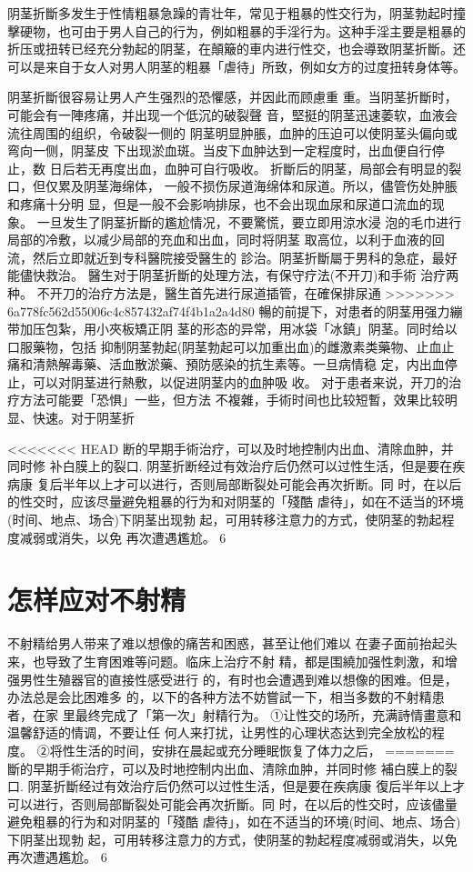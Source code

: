 \documentclass[12pt,UTF8]{ctexbook}
\begin{document}
阴茎折斷多发生于性情粗暴急躁的青壮年，常见于粗暴的性交行为，阴茎勃起时撞擊硬物，也可由于男人自己的行为，例如粗暴的手淫行为。这种手淫主要是粗暴的折压或扭转已经充分勃起的阴茎，在顛簸的車内进行性交，也会導致阴茎折斷。还可以是来自于女人对男人阴茎的粗暴「虐待」所致，例如女方的过度扭转身体等。

阴茎折斷很容易让男人产生强烈的恐懼感，并因此而顾慮重
重。当阴茎折斷时，可能会有一陣疼痛，并出现一个低沉的破裂聲
音，堅挺的阴茎迅速萎软，血液会流往周围的组织，令破裂一侧的
阴茎明显肿脹，血肿的压迫可以使阴茎头偏向或弯向一侧，阴茎皮
下出现淤血斑。当皮下血肿达到一定程度时，出血便自行停止，数
日后若无再度出血，血肿可自行吸收。
折斷后的阴茎，局部会有明显的裂口，但仅累及阴茎海绵体，
一般不损伤尿道海绵体和尿道。所以，儘管伤处肿脹和疼痛十分明
显，但是一般不会影响排尿，也不会出现血尿和尿道口流血的现
象。
一旦发生了阴茎折斷的尷尬情况，不要驚慌，要立即用涼水浸
泡的毛巾进行局部的冷敷，以减少局部的充血和出血，同时将阴茎
取高位，以利于血液的回流，然后立即就近到专科醫院接受醫生的
診治。阴茎折斷屬于男科的急症，最好能儘快救治。
醫生对于阴茎折斷的处理方法，有保守疗法(不开刀)和手術
治疗两种。
不开刀的治疗方法是，醫生首先进行尿道插管，在確保排尿通
>>>>>>> 6a778fc562d55006c4c857432af74f4b1a2a4d80
暢的前提下，对患者的阴茎用强力繃带加压包紮，用小夾板矯正阴
茎的形态的异常，用冰袋「冰鎮」阴茎。同时给以口服藥物，包括
抑制阴茎勃起(阴茎勃起可以加重出血)的雌激素类藥物、止血止
痛和清熱解毒藥、活血散淤藥、預防感染的抗生素等。一旦病情稳
定，内出血停止，可以对阴茎进行熱敷，以促进阴茎内的血肿吸
收。
对于患者来说，开刀的治疗方法可能要「恐惧」一些，但方法
不複雜，手術时间也比较短暫，效果比较明显、快速。对于阴茎折

<<<<<<< HEAD
断的早期手術治疗，可以及时地控制内出血、清除血肿，并同时修
补白膜上的裂口.
阴茎折断经过有效治疗后仍然可以过性生活，但是要在疾病康
复后半年以上才可以进行，否则局部断裂处可能会再次折断。同
时，在以后的性交时，应该尽量避免粗暴的行为和对阴茎的「殘酷
虐待」，如在不适当的环境(时间、地点、场合)下阴茎出现勃
起，可用转移注意力的方式，使阴茎的勃起程度减弱或消失，以免
再次遭遇尷尬。
6
\section{怎样应对不射精}
不射精给男人带来了难以想像的痛苦和困惑，甚至让他们难以
在妻子面前抬起头来，也导致了生育困难等问题。临床上治疗不射
精，都是围繞加强性刺激，和增强男性生殖器官的直接性感受进行
的，有时也会遭遇到难以想像的困难。但是，办法总是会比困难多
的，以下的各种方法不妨嘗試一下，相当多数的不射精患者，在家
里最终完成了「第一次」射精行为。
①让性交的场所，充满詩情畫意和温馨舒适的情调，不要让任
何人来打扰，让男性的心理状态达到完全放松的程度。
②将性生活的时间，安排在晨起或充分睡眠恢复了体力之后，
=======
斷的早期手術治疗，可以及时地控制内出血、清除血肿，并同时修
補白膜上的裂口.
阴茎折斷经过有效治疗后仍然可以过性生活，但是要在疾病康
復后半年以上才可以进行，否则局部斷裂处可能会再次折斷。同
时，在以后的性交时，应该儘量避免粗暴的行为和对阴茎的「殘酷
虐待」，如在不适当的环境(时间、地点、场合)下阴茎出现勃
起，可用转移注意力的方式，使阴茎的勃起程度减弱或消失，以免
再次遭遇尷尬。
6
\end{document}
